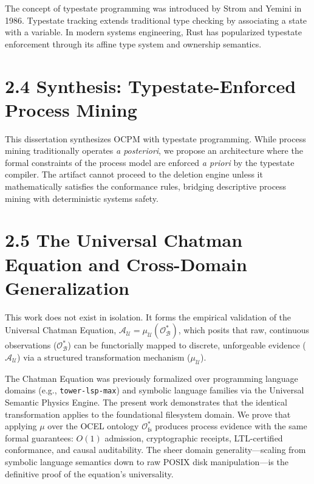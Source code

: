 \documentclass[
  12pt,
]{report}
\begin{document}
The concept of typestate programming was introduced by Strom and Yemini
in 1986. Typestate tracking extends traditional type checking by
associating a state with a variable. In modern systems engineering, Rust
has popularized typestate enforcement through its affine type system and
ownership semantics.

\section{2.4 Synthesis: Typestate-Enforced Process
Mining}\label{synthesis-typestate-enforced-process-mining}

This dissertation synthesizes OCPM with typestate programming. While
process mining traditionally operates \emph{a posteriori}, we propose an
architecture where the formal constraints of the process model are
enforced \emph{a priori} by the typestate compiler. The artifact cannot
proceed to the deletion engine unless it mathematically satisfies the
conformance rules, bridging descriptive process mining with
deterministic systems safety.

\section{2.5 The Universal Chatman Equation and Cross-Domain
Generalization}\label{the-universal-chatman-equation-and-cross-domain-generalization}

This work does not exist in isolation. It forms the empirical validation
of the Universal Chatman Equation,
\(\mathcal{A}_{\mathcal{U}} = \mu_{\mathcal{U}}(\mathcal{O}^*_{\mathcal{B}})\),
which posits that raw, continuous observations
(\(\mathcal{O}^*_{\mathcal{B}}\)) can be functorially mapped to
discrete, unforgeable evidence (\(\mathcal{A}_{\mathcal{U}}\)) via a
structured transformation mechanism (\(\mu_{\mathcal{U}}\)).

The Chatman Equation was previously formalized over programming language
domains (e.g., \texttt{tower-lsp-max}) and symbolic language families
via the Universal Semantic Physics Engine. The present work demonstrates
that the identical transformation applies to the foundational filesystem
domain. We prove that applying \(\mu\) over the OCEL ontology
\(\mathcal{O}^*_{\text{fs}}\) produces process evidence with the same
formal guarantees: \(O(1)\) admission, cryptographic receipts,
LTL-certified conformance, and causal auditability. The sheer domain
generality---scaling from symbolic language semantics down to raw POSIX
disk manipulation---is the definitive proof of the equation's
universality.
\end{document}
